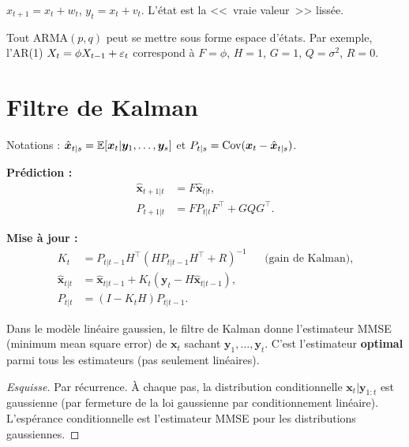 \begin{exemple}
$x_{t+1}=x_t+w_t$, $y_t=x_t+v_t$. L'\'etat est la <<~vraie valeur~>> liss\'ee.
\end{exemple}

\begin{exemple}
Tout ARMA$(p,q)$ peut se mettre sous forme espace d'\'etats. Par exemple, l'AR(1) $X_t=\phi X_{t-1}+\varepsilon_t$ correspond \`a $F=\phi$, $H=1$, $G=1$, $Q=\sigma^2$, $R=0$.
\end{exemple}

\section{Filtre de Kalman}

\begin{definition}
Notations : $\hat{\bm{x}}_{t|s}=\mathbb{E}[\bm{x}_t|\bm{y}_1,\ldots,\bm{y}_s]$ et $P_{t|s}=\operatorname{Cov}(\bm{x}_t-\hat{\bm{x}}_{t|s})$.

\medskip
\textbf{Pr\'ediction :}
\begin{align}
\hat{\bm{x}}_{t+1|t} &= F\hat{\bm{x}}_{t|t}, \\
P_{t+1|t} &= FP_{t|t}F^\top + GQG^\top.
\end{align}

\textbf{Mise \`a jour :}
\begin{align}
K_t &= P_{t|t-1}H^\top(HP_{t|t-1}H^\top+R)^{-1} && \text{(gain de Kalman)},\\
\hat{\bm{x}}_{t|t} &= \hat{\bm{x}}_{t|t-1} + K_t(\bm{y}_t - H\hat{\bm{x}}_{t|t-1}), \\
P_{t|t} &= (I-K_tH)P_{t|t-1}.
\end{align}
\end{definition}

\begin{theoreme}
Dans le mod\`ele lin\'eaire gaussien, le filtre de Kalman donne l'estimateur MMSE (minimum mean square error) de $\bm{x}_t$ sachant $\bm{y}_1,\ldots,\bm{y}_t$. C'est l'estimateur \textbf{optimal} parmi tous les estimateurs (pas seulement lin\'eaires).
\end{theoreme}

\begin{proof}[Esquisse]
Par r\'ecurrence. \`A chaque pas, la distribution conditionnelle $\bm{x}_t|\bm{y}_{1:t}$ est gaussienne (par fermeture de la loi gaussienne par conditionnement lin\'eaire). L'esp\'erance conditionnelle est l'estimateur MMSE pour les distributions gaussiennes.
\end{proof}

